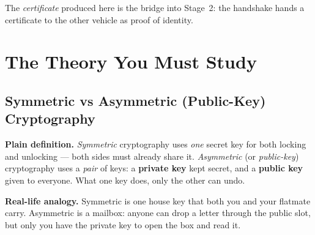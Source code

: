 \documentclass[11pt,a4paper]{article}
\begin{document}
\begin{center}
\end{center}

\noindent The \emph{certificate} produced here is the bridge into Stage~2: the
handshake hands a certificate to the other vehicle as proof of identity.

\section{The Theory You Must Study}

\subsection{Symmetric vs Asymmetric (Public-Key) Cryptography}
\textbf{Plain definition.} \emph{Symmetric} cryptography uses \emph{one} secret
key for both locking and unlocking --- both sides must already share it.
\emph{Asymmetric} (or \emph{public-key}) cryptography uses a \emph{pair} of
keys: a \textbf{private key} kept secret, and a \textbf{public key} given to
everyone. What one key does, only the other can undo.

\textbf{Real-life analogy.} Symmetric is one house key that both you and your
flatmate carry. Asymmetric is a mailbox: anyone can drop a letter through the
public slot, but only you have the private key to open the box and read it.
\end{document}
